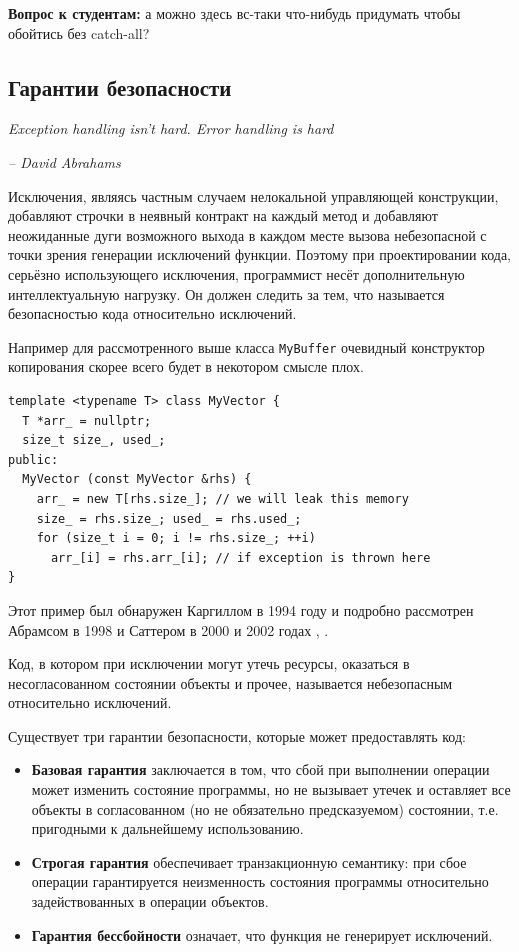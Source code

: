 \documentclass[a4paper,12pt,oneside]{book}
\newif\ifanswers
\begin{document}
\textbf{Вопрос к студентам:} а можно здесь вс-таки что-нибудь придумать чтобы обойтись без catch-all?

\ifanswers
Правильный ответ: да, например завернуть ресурс в RAII-обёртку, чтобы он был автоматически правильно очищен при размотке стека.
\fi

\pagebreak
\subsection{Гарантии безопасности}\label{sub:excsafety}

\hfill\textit{Exception handling isn't hard. Error handling is hard}{\vspace{0.5em}}

\hfill\textit{-- David Abrahams}

Исключения, являясь частным случаем нелокальной управляющей конструкции, добавляют строчки в неявный контракт на каждый метод и добавляют неожиданные дуги возможного выхода в каждом месте вызова небезопасной с точки зрения генерации исключений функции. Поэтому при проектировании кода, серьёзно использующего исключения, программист несёт дополнительную интеллектуальную нагрузку. Он должен следить за тем, что называется безопасностью кода относительно исключений.

Например для рассмотренного выше класса \lstinline!MyBuffer! очевидный конструктор копирования скорее всего будет в некотором смысле плох.

\begin{lstlisting}
template <typename T> class MyVector {
  T *arr_ = nullptr;
  size_t size_, used_;
public:
  MyVector (const MyVector &rhs) {
    arr_ = new T[rhs.size_]; // we will leak this memory
    size_ = rhs.size_; used_ = rhs.used_;
    for (size_t i = 0; i != rhs.size_; ++i)
      arr_[i] = rhs.arr_[i]; // if exception is thrown here
}
\end{lstlisting}

Этот пример был обнаружен Каргиллом в 1994 году \cite{Cargill} и подробно рассмотрен Абрамсом в 1998 \cite{Abrahams} и Саттером в 2000 и 2002 годах \cite{exceptionalcpp}, \cite{moreexceptionalcpp}.

Код, в котором при исключении могут утечь ресурсы, оказаться в несогласованном состоянии объекты и прочее, называется небезопасным относительно исключений. 

Существует три гарантии безопасности, которые может предоставлять код:

\begin{itemize}
\item
\textbf{Базовая гарантия} заключается в том, что сбой при выполнении операции может изменить состояние программы, но не вызывает утечек и оставляет все объекты в согласованном (но не обязательно предсказуемом) состоянии, т.е. пригодными к дальнейшему использованию.
\item
\textbf{Строгая гарантия} обеспечивает транзакционную семантику: при сбое операции гарантируется неизменность состояния программы относительно задействованных в операции объектов.
\item
\textbf{Гарантия бессбойности} означает, что функция не генерирует исключений.
\end{itemize}
\end{document}
